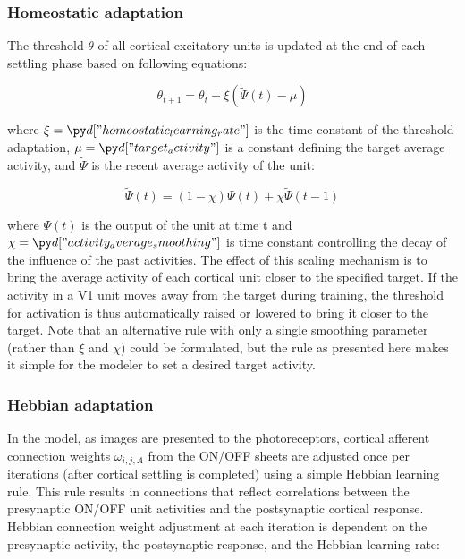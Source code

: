 \documentclass[a4paper,10pt]{article}
\begin{document}
\subsubsection{Homeostatic adaptation}

The threshold $\theta$ of all cortical excitatory units is updated at the end of each settling phase based on following 
equations:

\begin{equation}
	\theta_{t+1} = \theta_{t} + \xi (\tilde{\Psi}(t) - \mu) 
\end{equation}

where $\xi=\insval{homeostatic_learning_rate}$ is the time constant of the threshold adaptation,
$\mu=\insval{target_activity}$ is a constant defining the target average activity, and $\tilde{\Psi}$ is 
the recent average activity of the unit:

\begin{equation}
  \tilde{\Psi}(t) = (1 - \chi)\Psi(t) + \chi\tilde{\Psi}(t-1)  
\end{equation}

\noindent where $\Psi(t)$ is the output of the unit at time t and $\chi=\insval{activity_average_smoothing}$ is time constant 
controlling the decay of the influence of the past activities. The effect of this scaling mechanism is to bring the average activity of each 
cortical unit closer to the specified target. If the activity in a V1 unit moves away from the target during training, the threshold for activation is thus automatically raised or lowered to bring it closer to the target. Note that an alternative rule with only a single smoothing parameter (rather than
$\xi$ and  $\chi$) could be formulated, but the rule as presented here makes it simple for the modeler to set a desired target activity.

\subsubsection{Hebbian adaptation}

In the model, as images are presented to the photoreceptors, cortical afferent connection weights $\omega_{i,j,A}$ from the ON/OFF sheets are adjusted once per iterations (after cortical settling is completed) using a simple Hebbian learning rule. This rule results in connections that reflect correlations between the presynaptic ON/OFF unit activities and the postsynaptic cortical response. Hebbian connection weight adjustment at each iteration is dependent on the presynaptic activity, the postsynaptic response, and the Hebbian learning rate:
\end{document}

